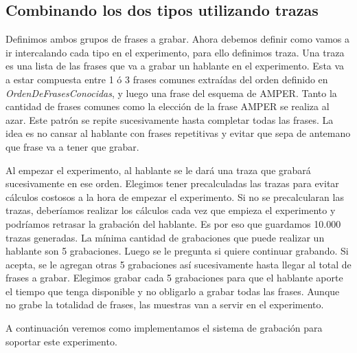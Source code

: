 \subsection{Combinando los dos tipos utilizando trazas}

Definimos ambos grupos de frases a grabar. Ahora debemos definir como vamos a ir intercalando cada tipo en el experimento, para ello definimos traza. Una traza es una lista de las frases que va a grabar un hablante en el experimento. Esta va a estar compuesta entre 1 ó 3 frases comunes extraídas del orden definido en \textit{OrdenDeFrasesConocidas}, y luego una frase del esquema de AMPER. Tanto la cantidad de frases comunes como la elección de la frase AMPER se realiza al azar. Este patrón se repite sucesivamente hasta completar todas las frases. La idea es no cansar al hablante con frases repetitivas y evitar que sepa de antemano que frase va a tener que grabar. 

Al empezar el experimento, al hablante se le dará una traza que grabará sucesivamente en ese orden. Elegimos tener precalculadas las trazas para evitar cálculos costosos a la hora de empezar el experimento. Si no se precalcularan las trazas, deberíamos realizar los cálculos cada vez que empieza el experimento y podríamos retrasar la grabación del hablante. Es por eso que guardamos 10.000 trazas generadas. La mínima cantidad de grabaciones que puede realizar un hablante son 5 grabaciones. Luego se le pregunta si quiere continuar grabando. Si acepta, se le agregan otras 5 grabaciones así sucesivamente hasta llegar al total de frases a grabar. Elegimos grabar cada 5 grabaciones para que el hablante aporte el tiempo que tenga disponible y no obligarlo a grabar todas las frases. Aunque no grabe la totalidad de frases, las muestras van a servir en el experimento.

A continuación veremos como implementamos el sistema de grabación para soportar este experimento.